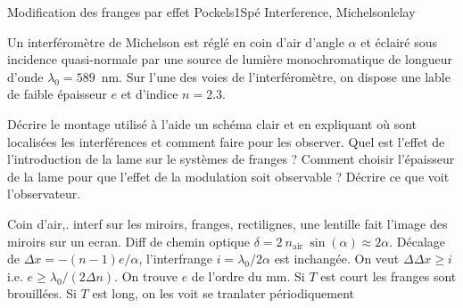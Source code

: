 \begin{exercise}{Modification des franges par effet Pockels}{1}{Spé}
{Interference, Michelson}{lelay}

Un interféromètre de Michelson est réglé en coin d'air d'angle $\alpha$ et éclairé sous incidence quasi-normale par une source de lumière monochromatique de longueur d'onde $\lambda_0 = 589$~nm. Sur l'une des voies de l'interféromètre, on dispose une lable de faible épaisseur $e$ et d'indice $n = 2.3$.

\begin{questions}
    \questioncours Décrire le montage utilisé à l'aide un schéma clair et en expliquant où sont localisées les interférences et comment faire pour les observer.
    \question Quel est l'effet de l'introduction de la lame sur le systèmes de franges ?
    \question Comment choisir l'épaisseur de la lame pour que l'effet de la modulation soit observable ?
    \question Décrire ce que voit l'observateur.
\end{questions}

\end{exercise}


\begin{solution}

\begin{questions}
    \questioncours Coin d'air,. interf sur les miroirs, franges, rectilignes, une lentille fait l'image des miroirs sur un ecran.
    \question Diff de chemin optique $\delta = 2\ n_\text{air}\ \sin(\alpha)\approx 2\alpha$. Décalage de $\Delta x = -(n-1)e/\alpha$, l'interfrange $i = \lambda_0/2\alpha$ est inchangée.
    \question On veut $\Delta\Delta x \geq i$ i.e. $e \geq \lambda_0/(2\Delta n)$. On trouve $e$ de l'ordre du mm.
    \question Si $T$ est court les franges sont brouillées. Si $T$ est long, on les voit se tranlater périodiquement
\end{questions}
\end{solution}

